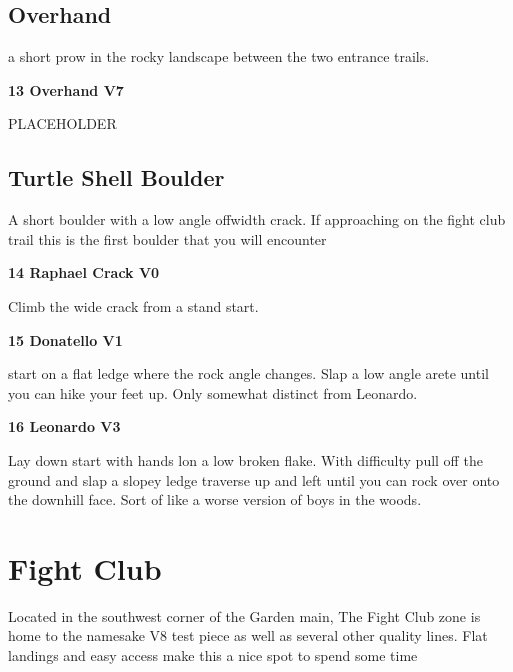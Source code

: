 \begin{multicols*}{2}
			\subsection*{Overhand}\label{bf:Overhand}
			a short prow in the rocky landscape between the two entrance trails.
			

					\label{rt:Overhand} \colorbox{Goldenrod!50}{\textbf{13 Overhand V7  }}
					\begin{adjustwidth}{1cm}{}
					PLACEHOLDER
					\end{adjustwidth}
			\subsection*{Turtle Shell Boulder}\label{bf:Turtle Shell Boulder}
			A short boulder with a low angle offwidth crack. If approaching on the fight club trail this is the first boulder that you will encounter
			

					\label{rt:Raphael Crack} \colorbox{green!20}{\textbf{14 Raphael Crack V0   }}
					\begin{adjustwidth}{1cm}{}
					Climb the wide crack from a stand start.
					\end{adjustwidth}
					\label{rt:Donatello} \colorbox{green!20}{\textbf{15 Donatello V1   }}
					\begin{adjustwidth}{1cm}{}
					start on a flat ledge where the rock angle changes. Slap a low angle arete until you can hike your feet up. Only somewhat distinct from Leonardo.
					\end{adjustwidth}
					\label{rt:Leonardo} \colorbox{green!20}{\textbf{16 Leonardo V3   }}
					\begin{adjustwidth}{1cm}{}
					Lay down start with hands lon a low broken flake. With difficulty pull off the ground and slap a slopey ledge traverse up and left until you can rock over onto the downhill face. Sort of like a worse version of boys in the woods.
					\end{adjustwidth}
		\section{Fight Club}\label{sa:Fight Club}
	Located in the southwest corner of the Garden main, The Fight Club zone is home to the namesake V8 test piece as well as several other quality lines. Flat landings and easy access make this a nice spot to spend some time


\end{multicols*}
